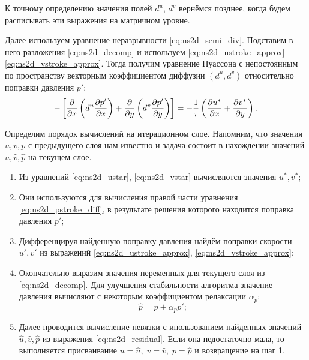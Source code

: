 К точному определению значения полей $d^u$, $d^v$ вернёмся позднее, когда будем расписывать
эти выражения на матричном уровне.

Далее используем уравнение неразрывности \eqref{eq:ns2d_semi_div}. Подставим
в него разложения \eqref{eq:ns2d_decomp} и используем
\eqref{eq:ns2d_ustroke_approx}-\eqref{eq:ns2d_vstroke_approx}.
Тогда
получим уравнение Пуассона с непостоянным по пространству векторным коэффициентом диффузии $\left(d^u, d^v\right)$
относительно поправки давления $p'$:
\begin{equation}
    \label{eq:ns2d_pstroke_diff}
    -\left[
    \frac{\partial }{\partial x}\left(
       d^u \frac{\partial p'}{\partial x} 
            \right)
    +\frac{\partial }{\partial y}\left(
       d^v \frac{\partial p'}{\partial y} 
            \right)
    \right]
    =
    -\frac{1}{\tau}\left(
            \frac{\partial u^*}{\partial x} + \frac{\partial v^*}{\partial y}
    \right).
\end{equation}

Определим порядок вычислений на итерационном слое.
Напомним, что значения $u, v, p$ с
предыдущего слоя нам известно и задача
состоит в нахождении значений $\hat u, \hat v, \hat p$
на текущем слое.

\begin{enumerate}
\item Из уравнений \eqref{eq:ns2d_ustar}, \eqref{eq:ns2d_vstar}
      вычисляются значения $u^*, v^*$;
\item Они используются для вычисления правой части уравнения \eqref{eq:ns2d_pstroke_diff},
      в результате решения которого находится поправка давления $p'$;
\item Дифференцируя найденную поправку давления найдём поправки скорости $u', v'$
      из выражений \eqref{eq:ns2d_ustroke_approx}, \eqref{eq:ns2d_vstroke_approx};
\item Окончательно выразим значения переменных для текущего слоя из \eqref{eq:ns2d_decomp}.
      Для улучшения стабильности алгоритма значение давления вычисляют
      с некоторым коэффициентом релаксации $\alpha_p$:
      \begin{equation*}
           \hat p = p + \alpha_p p';
      \end{equation*}
\item Далее проводится вычисление невязки с ипользованием найденных значений $\hat u, \hat v, \hat p$
      из выражения \eqref{eq:ns2d_residual}. Если она недостаточно мала,
      то выполняется присваивание
      $
           u = \hat u, \; v=\hat v, \; p = \hat p
      $ 
      и возвращение на шаг 1.
\end{enumerate}

